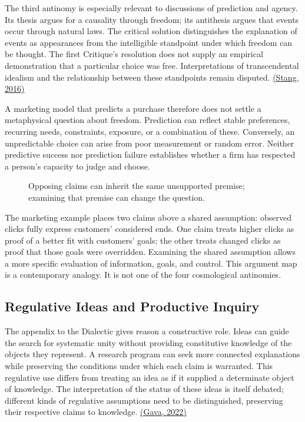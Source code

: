 The third antinomy is especially relevant to discussions of prediction
and agency. Its thesis argues for a causality through freedom; its
antithesis argues that events occur through natural laws. The critical
solution distinguishes the explanation of events as appearances from the
intelligible standpoint under which freedom can be thought. The first
Critique's resolution does not supply an empirical demonstration that a
particular choice was free. Interpretations of transcendental idealism
and the relationship between these standpoints remain disputed.
\href{https://plato.stanford.edu/entries/kant-transcendental-idealism/}{(Stang,
2016)}

A marketing model that predicts a purchase therefore does not settle a
metaphysical question about freedom. Prediction can reflect stable
preferences, recurring needs, constraints, exposure, or a combination of
these. Conversely, an unpredictable choice can arise from poor
measurement or random error. Neither predictive success nor prediction
failure establishes whether a firm has respected a person's capacity to
judge and choose.

\begin{figure}[htbp]
\centering

\caption{Opposing claims can inherit the same unsupported premise; examining that premise can change the question.}\label{fig:M09_shared_premise}
\end{figure}

The marketing example places two claims above a shared assumption:
observed clicks fully express customers' considered ends. One claim
treats higher clicks as proof of a better fit with customers' goals; the
other treats changed clicks as proof that those goals were overridden.
Examining the shared assumption allows a more specific evaluation of
information, goals, and control. This argument map is a contemporary
analogy. It is not one of the four cosmological antinomies.

\hypertarget{M09-regulative-ideas-and-productive-inquiry}{%
\subsection{Regulative Ideas and Productive
Inquiry}\label{M09-regulative-ideas-and-productive-inquiry}}

\noindent \noindent The appendix to the Dialectic gives reason a constructive
role. Ideas can guide the search for systematic unity without providing
constitutive knowledge of the objects they represent. A research program
can seek more connected explanations while preserving the conditions
under which each claim is warranted. This regulative use differs from
treating an idea as if it supplied a determinate object of knowledge.
The interpretation of the status of these ideas is itself debated;
different kinds of regulative assumptions need to be distinguished,
preserving their respective claims to knowledge.
\href{https://doi.org/10.1515/opphil-2022-0202}{(Gava, 2022)}

